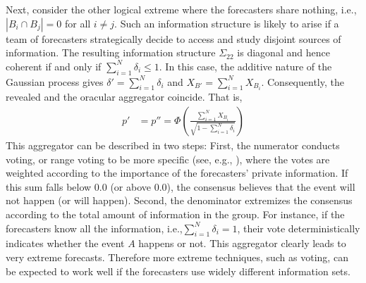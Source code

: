 \documentclass[11pt]{article}
\theoremstyle{definition}
\theoremstyle{definition}
\begin{document}
Next, consider the other logical extreme where the forecasters share nothing, i.e., $|B_{i} \cap B_{j}| = 0$ for all $i \neq j$. Such
an information structure is likely to arise if a team of forecasters
strategically decide to access and study disjoint sources of
information. The resulting information structure $\Sigma_{22}$ is
diagonal and hence coherent if and only if $\sum_{i=1}^N \delta_i
\leq 1$. In this case, the additive nature of the Gaussian process gives $\delta' = \sum_{i=1}^N \delta_i$ and $X_{B'} = \sum_{i=1}^N X_{B_i}$. Consequently, the revealed and  the oracular aggregator coincide. That is,
 \begin{align*}
p' &= p'' =  \Phi\left( \frac{\sum_{i=1}^N X_{B_i}}
  {\sqrt{1- \sum_{i=1}^N \delta_i}} \right) 
\end{align*}
This aggregator can be described in two steps: First, the numerator conducts voting, or range voting to be more specific (see, e.g.,
\citealt{fishkin1997voice}), where the votes are weighted according to
the importance of the forecasters' private information.  If this sum falls below
$0.0$ (or above $0.0$), the consensus believes that the event will not
happen (or will happen). Second, the
denominator extremizes the consensus according to the total
amount of information in the group. For instance, if the forecasters
know all the information, i.e.,$\sum_{i=1}^N \delta_i = 1$, their vote
deterministically indicates whether the event $A$ happens or not. This
aggregator clearly leads to very extreme forecasts. Therefore
more extreme techniques, such as voting, can be expected to work well
if the forecasters use widely different information sets.
\end{document}

